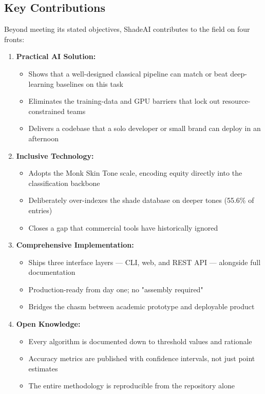 \subsection{Key Contributions}

Beyond meeting its stated objectives, ShadeAI contributes to the field on four fronts:

\begin{enumerate}
    \item \textbf{Practical AI Solution:}
    \begin{itemize}
        \item Shows that a well-designed classical pipeline can match or beat deep-learning baselines on this task
        \item Eliminates the training-data and GPU barriers that lock out resource-constrained teams
        \item Delivers a codebase that a solo developer or small brand can deploy in an afternoon
    \end{itemize}
    
    \item \textbf{Inclusive Technology:}
    \begin{itemize}
        \item Adopts the Monk Skin Tone scale, encoding equity directly into the classification backbone
        \item Deliberately over-indexes the shade database on deeper tones (55.6\% of entries)
        \item Closes a gap that commercial tools have historically ignored
    \end{itemize}
    
    \item \textbf{Comprehensive Implementation:}
    \begin{itemize}
        \item Ships three interface layers — CLI, web, and REST API — alongside full documentation
        \item Production-ready from day one; no "assembly required"
        \item Bridges the chasm between academic prototype and deployable product
    \end{itemize}
    
    \item \textbf{Open Knowledge:}
    \begin{itemize}
        \item Every algorithm is documented down to threshold values and rationale
        \item Accuracy metrics are published with confidence intervals, not just point estimates
        \item The entire methodology is reproducible from the repository alone
    \end{itemize}
\end{enumerate}


